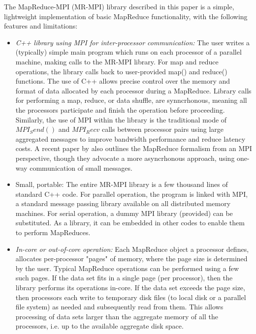 The MapReduce-MPI (MR-MPI) library described in this paper is a
simple, lightweight implementation of basic MapReduce functionality,
with the following features and limitations:

\begin{itemize}

\item {\it C++ library using MPI for inter-processor communication:}
The user writes a (typically) simple main program which runs on each
processor of a parallel machine, making calls to the MR-MPI library.
For map and reduce operations, the library calls back to user-provided
map() and reduce() functions.  The use of C++ allows precise control
over the memory and format of data allocated by each processor during
a MapReduce.  Library calls for performing a map, reduce, or data
shuffle, are synncrhonous, meaning all the processors participate and
finish the operation before proceeding.  Similarly, the use of MPI
within the library is the traditional mode of $MPI_Send()$ and
$MPI_Recv$ calls between processor pairs using large aggregated
messages to improve bandwidth performance and reduce latency costs.  A
recent paper by \cite{Dongarra} also outlines the MapReduce formalism
from an MPI perspective, though they advocate a more asyncrhonous
approach, using one-way communication of small messages.

\item {Small, portable:} The entire MR-MPI library is a few thousand
lines of standard C++ code.  For parallel operation, the program is
linked with MPI, a standard message passing library available on all
distributed memory machines.  For serial operation, a dummy MPI
library (provided) can be substituted.  As a library, it can be
embedded in other codes \cite{Titan,TitanURL} to enable them to
perform MapReduces.

\item {\it In-core or out-of-core operation:} Each MapReduce object a
processor defines, allocates per-processor "pages" of memory, where
the page size is determined by the user.  Typical MapReduce operations
can be performed using a few such pages.  If the data set fits in a
single page (per processor), then the library performs its operations
in-core.  If the data set exceeds the page size, then processors each
write to temporary disk files (to local disk or a parallel file
system) as needed and subsequently read from them.  This allows
processing of data sets larger than the aggregate memory of all the
processors, i.e. up to the available aggregate disk space.


\end{itemize}
